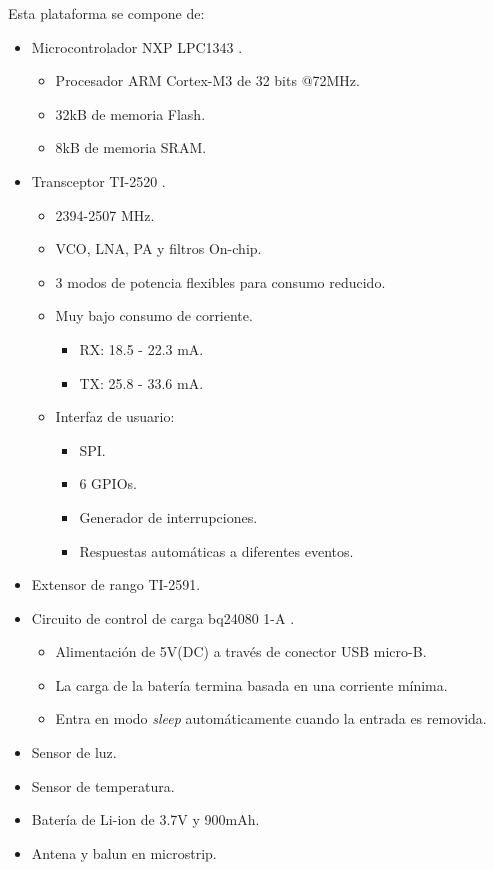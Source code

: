 \noindent Esta plataforma se compone de:
\begin{itemize}
\item Microcontrolador NXP LPC1343 \citep{1343}.
   \begin{itemize}
   \item Procesador ARM Cortex-M3 de 32 bits @72MHz. 
   \item 32kB de memoria Flash.
   \item 8kB de memoria SRAM.
   \end{itemize}
\item Transceptor TI-2520 \citep{2520}.
		\begin{itemize}
			\item 2394-2507 MHz.
			\item VCO, LNA, PA y filtros On-chip.
			\item 3 modos de potencia flexibles para consumo reducido.
			\item Muy bajo consumo de corriente.
			\begin{itemize}
				\item RX: 18.5 - 22.3 mA.
				\item TX: 25.8 - 33.6 mA.
			\end{itemize}
			\item Interfaz de usuario:
			\begin{itemize}
				\item SPI.
				\item 6 GPIOs.
 				\item Generador de interrupciones.
				\item Respuestas automáticas a diferentes eventos.
			\end{itemize}
		\end{itemize}
\item Extensor de rango TI-2591.
\item Circuito de control de carga bq24080 1-A \citep{bq}.
		\begin{itemize}
			\item Alimentación de 5V(DC) a través de conector USB micro-B.
			\item La carga de la batería termina basada en una corriente mínima.
			\item Entra en modo \textit{sleep} automáticamente cuando la entrada es removida.		
		\end{itemize}
\item Sensor de luz.
\item Sensor de temperatura.
\item Batería de Li-ion de 3.7V y 900mAh.
\item Antena y balun en microstrip.
\end{itemize}

